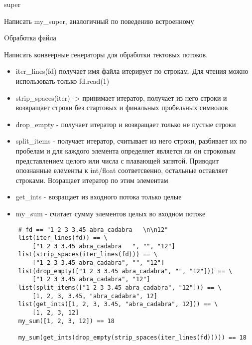 \documentclass{article}
\begin{document}
\begin{center} super \end{center}
Написать my\_super, аналогичный по поведению встроенному 
\newpage

\begin{center} Oбработка файла \end{center}
Написать конвеерные генераторы для обработки тектовых потоков.
\begin{itemize}
    \item iter\_lines(fd) получает имя файла итерирует по строкам. 
           Для чтения можно использовать только fd.read(1)
    \item strip\_spaces(iter) -> принимает итератор, получает из него 
          строки и возвращает строки без стартовых и финальных пробельных символов
    \item drop\_empty - получает итератор и возвращает только не пустые строки
    \item split\_items - получает итератор, считывает из него строки, 
          разбивает их по пробелам и для каждого элемента определяет является ли он
          строковым представлением целого или числа с плавающей запятой.
          Приводит опознанные елементы к int/float соответсвенно, остальные оставляет
          строками. Возращает итератор по этим элементам
    \item get\_ints - возращает из входного потока только целые
    \item my\_sum - считает сумму элементов целых во входном потоке
\end{itemize}

\begin{lstlisting}
    # fd == "1 2 3 3.45 abra_cadabra   \n\n12"
    list(iter_lines(fd)) == \
        ["1 2 3 3.45 abra_cadabra   ", "", "12"]
    list(strip_spaces(iter_lines(fd))) == \
        ["1 2 3 3.45 abra_cadabra", "", "12"]
    list(drop_empty(["1 2 3 3.45 abra_cadabra", "", "12"])) == \
        ["1 2 3 3.45 abra_cadabra", "12"]
    list(split_items(["1 2 3 3.45 abra_cadabra", "12"])) == \
        [1, 2, 3, 3.45, "abra_cadabra", 12]
    list(get_ints([1, 2, 3, 3.45, "abra_cadabra", 12])) == \
        [1, 2, 3, 12]
    my_sum([1, 2, 3, 12]) == 18

    my_sum(get_ints(drop_empty(strip_spaces(iter_lines(fd))))) == 18
\end{lstlisting}
\end{document}
